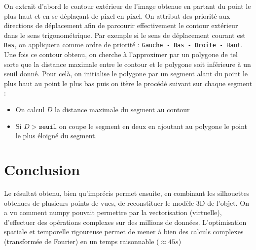 \documentclass{article}
\begin{document}
\begin{multicols}{2}
On extrait d'abord le contour extérieur de l'image obtenue en partant du point le plus haut et en se déplaçant de pixel en pixel. On attribut des priorité aux directions de déplacement afin de parcourir effectivement le contour extérieur dans le sens trigonométrique. Par exemple si le sens de déplacement courant est \texttt{Bas}, on appliquera comme ordre de priorité : \texttt{Gauche - Bas - Droite - Haut}.
Une fois ce contour obtenu, on cherche à l'approximer par un polygone de tel sorte que la distance maximale entre le contour et le polygone soit inférieure à un seuil donné. Pour celà, on initialise le polygone par un segment alant du point le plus haut au point le plus bas puis on itère le procédé suivant sur chaque segment :
\begin{itemize}
	\item On calcul $D$ la distance maximale du segment au contour
	\item Si $D > \mathtt{seuil}$ on coupe le segment en deux en ajoutant au polygone le point le plus éloigné du segment.
\end{itemize}

\section{Conclusion}
	Le résultat obtenu, bien qu'imprécis permet ensuite, en combinant les silhouettes obtenues de plusieurs points de vues, de reconstituer le modèle 3D de l'objet. On a vu comment numpy pouvait permettre par la vectorisation (virtuelle), d'effectuer des opérations complexes sur des millions de données. L'optimisation spatiale et temporelle rigoureuse permet de mener à bien des calculs complexes (transformée de Fourier) en un temps raisonnable ($\approx 45s$)

\end{multicols}
\end{document}
